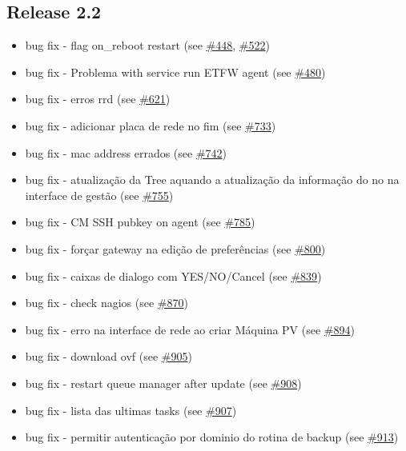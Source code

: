 \subsection{Release 2.2}
\begin{itemize}
    \item bug fix - flag on\_reboot restart (see \href{https://srcmaster.eurotux.com/pm/p/etva/ticket/448}{\#448}, \href{https://srcmaster.eurotux.com/pm/p/etva/ticket/522}{\#522})
    \item bug fix - Problema with service run ETFW agent (see \href{https://srcmaster.eurotux.com/pm/p/etva/ticket/480}{\#480})
    \item bug fix - erros rrd (see \href{https://srcmaster.eurotux.com/pm/p/etva/ticket/621}{\#621})
    \item bug fix - adicionar placa de rede no fim (see \href{https://srcmaster.eurotux.com/pm/p/etva/ticket/733}{\#733})
    \item bug fix - mac address errados (see \href{https://srcmaster.eurotux.com/pm/p/etva/ticket/742}{\#742})
    \item bug fix - atualização da Tree aquando a atualização da informação do no na interface de gestão (see \href{https://srcmaster.eurotux.com/pm/p/etva/ticket/755}{\#755})
    \item bug fix - CM SSH pubkey on agent (see \href{https://srcmaster.eurotux.com/pm/p/etva/ticket/785}{\#785})
    \item bug fix - forçar gateway na edição de preferências (see \href{https://srcmaster.eurotux.com/pm/p/etva/ticket/800}{\#800})
    \item bug fix - caixas de dialogo com YES/NO/Cancel (see \href{https://srcmaster.eurotux.com/pm/p/etva/ticket/839}{\#839})
    \item bug fix - check nagios (see \href{https://srcmaster.eurotux.com/pm/p/etva/ticket/870}{\#870})
    \item bug fix - erro na interface de rede ao criar Máquina PV (see \href{https://srcmaster.eurotux.com/pm/p/etva/ticket/894}{\#894})
    \item bug fix - download ovf (see \href{https://srcmaster.eurotux.com/pm/p/etva/ticket/905}{\#905})
    \item bug fix - restart queue manager after update (see \href{https://srcmaster.eurotux.com/pm/p/etva/ticket/908}{\#908})
    \item bug fix - lista das ultimas tasks (see \href{https://srcmaster.eurotux.com/pm/p/etva/ticket/907}{\#907})
    \item bug fix - permitir autenticação por dominio do rotina de backup (see \href{https://srcmaster.eurotux.com/pm/p/etva/ticket/913}{\#913})

\end{itemize}
